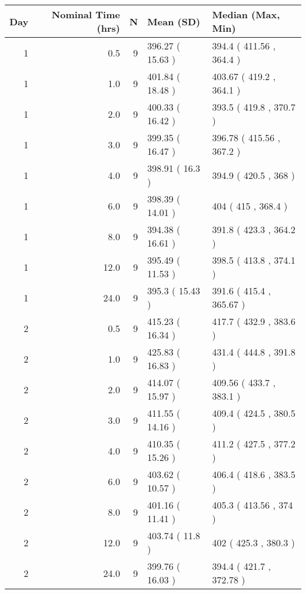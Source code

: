 
\begin{tabular}{rrrll}
\toprule
Day & Nominal Time (hrs) & N & Mean (SD) & Median (Max, Min)\\
\midrule
1 & 0.5 & 9 & 396.27 ( 15.63 ) & 394.4 ( 411.56 , 364.4 )\\
1 & 1.0 & 9 & 401.84 ( 18.48 ) & 403.67 ( 419.2 , 364.1 )\\
1 & 2.0 & 9 & 400.33 ( 16.42 ) & 393.5 ( 419.8 , 370.7 )\\
1 & 3.0 & 9 & 399.35 ( 16.47 ) & 396.78 ( 415.56 , 367.2 )\\
1 & 4.0 & 9 & 398.91 ( 16.3 ) & 394.9 ( 420.5 , 368 )\\
1 & 6.0 & 9 & 398.39 ( 14.01 ) & 404 ( 415 , 368.4 )\\
1 & 8.0 & 9 & 394.38 ( 16.61 ) & 391.8 ( 423.3 , 364.2 )\\
1 & 12.0 & 9 & 395.49 ( 11.53 ) & 398.5 ( 413.8 , 374.1 )\\
1 & 24.0 & 9 & 395.3 ( 15.43 ) & 391.6 ( 415.4 , 365.67 )\\
2 & 0.5 & 9 & 415.23 ( 16.34 ) & 417.7 ( 432.9 , 383.6 )\\
2 & 1.0 & 9 & 425.83 ( 16.83 ) & 431.4 ( 444.8 , 391.8 )\\
2 & 2.0 & 9 & 414.07 ( 15.97 ) & 409.56 ( 433.7 , 383.1 )\\
2 & 3.0 & 9 & 411.55 ( 14.16 ) & 409.4 ( 424.5 , 380.5 )\\
2 & 4.0 & 9 & 410.35 ( 15.26 ) & 411.2 ( 427.5 , 377.2 )\\
2 & 6.0 & 9 & 403.62 ( 10.57 ) & 406.4 ( 418.6 , 383.5 )\\
2 & 8.0 & 9 & 401.16 ( 11.41 ) & 405.3 ( 413.56 , 374 )\\
2 & 12.0 & 9 & 403.74 ( 11.8 ) & 402 ( 425.3 , 380.3 )\\
2 & 24.0 & 9 & 399.76 ( 16.03 ) & 394.4 ( 421.7 , 372.78 )\\
\bottomrule
\end{tabular}
